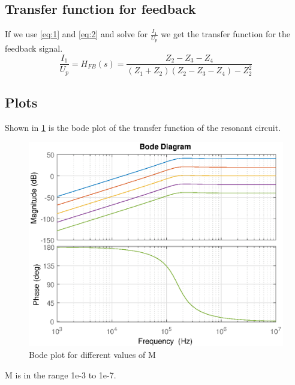 
\newpage
\subsection{Transfer function for feedback}
If we use \cref{eq:1} and \cref{eq:2} and solve for $\frac{I_1}{U_p}$ we get the transfer function for the feedback signal.
\begin{equation} \label{eq:fb}
\frac{I_1}{U_p} = H_{FB}(s) = \frac{Z_2-Z_3-Z_4}{(Z_1+Z_2)(Z_2-Z_3-Z_4)-Z_2^2}
\end{equation}


\newpage
\subsection{Plots}

Shown in \cref{fig:bode} is the bode plot of the transfer function of the resonant circuit.

\begin{figure}[h]
    \centering
    \includegraphics[width=\textwidth]{img/CoilRigBode_M.eps}
    \caption{Bode plot for different values of M}
    \label{fig:bode}
\end{figure}
M is in the range 1e-3 to 1e-7.

